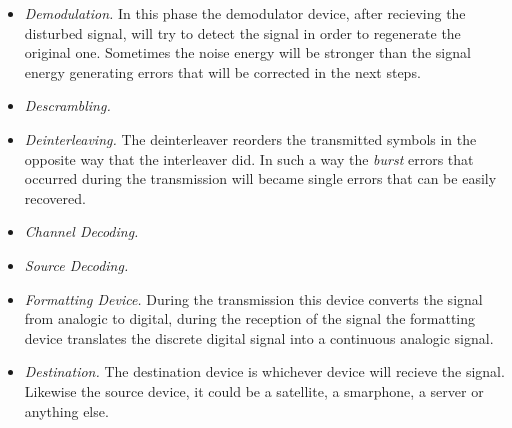 \begin{itemize}
    \item \textsl{Demodulation.} In this phase the demodulator device, after recieving the disturbed signal, will try to detect the signal in order to regenerate the original one. Sometimes the noise energy will be stronger than the signal energy generating errors that will be corrected in the next steps.
    \item \textsl{Descrambling.} \blindtext
    \item \textsl{Deinterleaving.} The deinterleaver reorders the transmitted symbols in the opposite way that the interleaver did. In such a way the \textit{burst} errors that occurred during the transmission will became single errors that can be easily recovered.
    \item \textsl{Channel Decoding.} \blindtext
    \item \textsl{Source Decoding.} \blindtext
    \item \textsl{Formatting Device.} During the transmission this device converts the signal from analogic to digital, during the reception of the signal the formatting device translates the discrete digital signal into a continuous analogic signal. 
    \item \textsl{Destination.} The destination device is whichever device will recieve the signal. Likewise the source device, it could be a satellite, a smarphone, a server or anything else.
\end{itemize}








